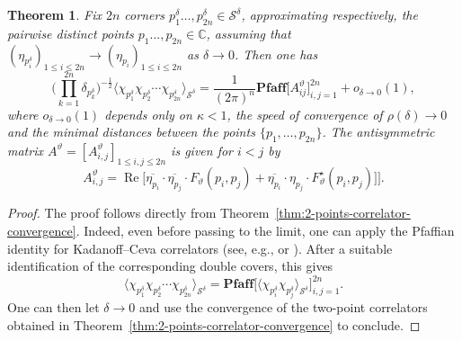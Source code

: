\documentclass[reqno]{amsart}
\numberwithin{equation}{section}
\newtheorem{theo}{Theorem}[section]
\theoremstyle{definition}
\theoremstyle{remark}
\renewcommand\Re{\operatorname{Re}}
\newcommand\cS{\mathcal{S}}
\begin{document}
\begin{theo}\label{thm:2n-points-correlator-convergence}
	Fix $2n$ corners $p^{\delta}_1\ldots,p^{\delta}_{2n} \in \cS^\delta$, approximating respectively, the pairwise distinct points $p_1\ldots,p_{2n} \in \mathbb{C}$, assuming that $(\eta_{p_i^\delta})_{1\leq i \leq 2n} \to (\eta_{p_i})_{1\leq i \leq 2n}$ as $\delta \to 0 $. Then one has
	\begin{equation}
	\big( \prod\limits_{k=1}^{2n} \delta_{p_k^\delta}\big)^{-\frac12} \langle \chi_{p^\delta_1} \chi_{p^\delta_2}  \cdots \chi_{p^\delta_{2n}} \rangle_{\cS^\delta}   = \frac{1}{(2\pi)^n} \mathbf{Pfaff} \big[ A^{\vartheta}_{ij} \big]_{i,j=1}^{2n} + o_{\delta \to 0}(1),
	\end{equation}	
where $o_{\delta \to 0}(1)$ depends only on $\kappa<1 $, the speed of convergence of $\rho(\delta) \to 0 $ and the minimal distances between the points $\{p_1,\ldots,p_{2n} \}$. The antisymmetric matrix $A^{\vartheta}=[A^{\vartheta}_{i,j}]_{1\leq i,j\leq 2n} $ is given for $i<j$ by
\begin{equation*}
	A^{\vartheta}_{i,j} = \Re \Big[ \overline{\eta_{p_i} } \cdot \overline{\eta_{p_j}}\cdot F_{\vartheta}(p_i,p_j) + \overline{\eta_{p_i}} \cdot \eta_{p_j }\cdot F^\star_{\vartheta}(p_i,p_j) ] \Big].
\end{equation*}
\end{theo}
	
\begin{proof}
	The proof follows directly from Theorem~\ref{thm:2-points-correlator-convergence}. Indeed, even before passing to the limit, one can apply the Pfaffian identity for Kadanoff--Ceva correlators (see, e.g., \cite[Proposition~2.24]{CHI-mixed} or \cite[Theorem~6.1]{ADWT}). After a suitable identification of the corresponding double covers, this gives
\begin{equation}
	\langle \chi_{p^\delta_1} \chi_{p^\delta_{2}} \cdots \chi_{p^\delta_{2n}} \rangle_{\cS^\delta} = \mathbf{Pfaff} \big[ \langle \chi_{p^\delta_i} \chi_{p^\delta_j} \rangle_{\cS^\delta} \big]_{i,j=1}^{2n}.
\end{equation}
One can then let $\delta \to 0$ and use the convergence of the two-point correlators obtained in Theorem~\ref{thm:2-points-correlator-convergence} to conclude.
\end{proof}	
\end{document}
